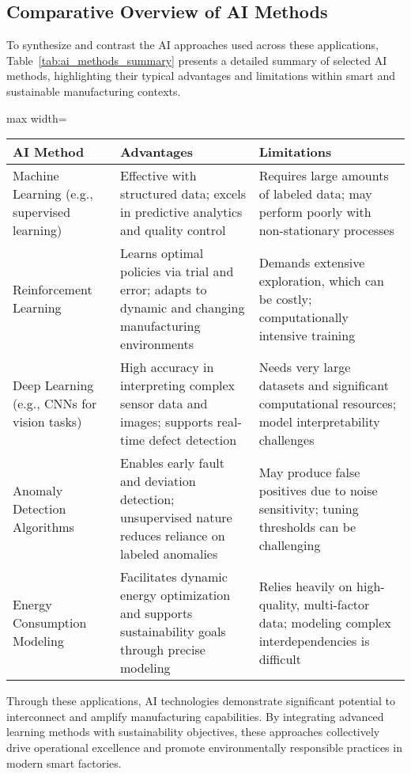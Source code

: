 \documentclass[sigconf]{acmart}
\begin{document}
\subsection{Comparative Overview of AI Methods}
To synthesize and contrast the AI approaches used across these applications, Table~\ref{tab:ai_methods_summary} presents a detailed summary of selected AI methods, highlighting their typical advantages and limitations within smart and sustainable manufacturing contexts.

\begin{table*}[htbp]
\centering
\caption{Summary of AI Methods Applied in Smart and Sustainable Manufacturing}
\label{tab:ai_methods_summary}
\begin{adjustbox}{max width=\textwidth}
\begin{tabular}{@{}lll@{}}
\toprule
\textbf{AI Method} & \textbf{Advantages} & \textbf{Limitations} \\ \midrule
Machine Learning (e.g., supervised learning) & Effective with structured data; excels in predictive analytics and quality control & Requires large amounts of labeled data; may perform poorly with non-stationary processes \\[6pt]
Reinforcement Learning & Learns optimal policies via trial and error; adapts to dynamic and changing manufacturing environments & Demands extensive exploration, which can be costly; computationally intensive training \\[6pt]
Deep Learning (e.g., CNNs for vision tasks) & High accuracy in interpreting complex sensor data and images; supports real-time defect detection & Needs very large datasets and significant computational resources; model interpretability challenges \\[6pt]
Anomaly Detection Algorithms & Enables early fault and deviation detection; unsupervised nature reduces reliance on labeled anomalies & May produce false positives due to noise sensitivity; tuning thresholds can be challenging \\[6pt]
Energy Consumption Modeling & Facilitates dynamic energy optimization and supports sustainability goals through precise modeling & Relies heavily on high-quality, multi-factor data; modeling complex interdependencies is difficult \\ \bottomrule
\end{tabular}
\end{adjustbox}
\end{table*}

Through these applications, AI technologies demonstrate significant potential to interconnect and amplify manufacturing capabilities. By integrating advanced learning methods with sustainability objectives, these approaches collectively drive operational excellence and promote environmentally responsible practices in modern smart factories.
\end{document}
